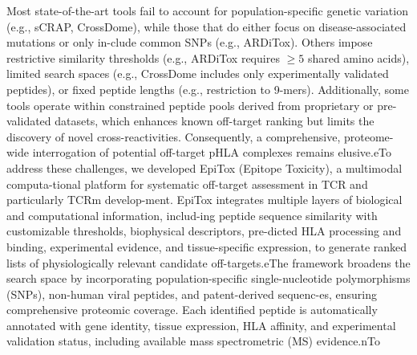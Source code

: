 \documentclass[unnumsec,webpdf,contemporary,large]{oup-authoring-template}%
\theoremstyle{thmstyleone}%
\theoremstyle{thmstyletwo}%
\theoremstyle{thmstylethree}%
\begin{document}
    Most state-of-the-art tools fail to account for population-specific genetic variation (e.g., sCRAP, CrossDome), while those that do either focus on disease-associated mutations or only in-clude common SNPs (e.g., ARDiTox). Others impose restrictive similarity thresholds (e.g., ARDiTox requires $\geq5$ shared amino acids), limited search spaces (e.g., CrossDome includes only experimentally validated peptides), or fixed peptide lengths (e.g., restriction to 9-mers). Additionally, some tools operate within constrained peptide pools derived from proprietary or pre-validated datasets, which enhances known off-target ranking but limits the discovery of novel cross-reactivities. 
    Consequently, a comprehensive, proteome-wide interrogation of potential off-target pHLA complexes remains elusive.eTo address these challenges, we developed EpiTox (Epitope Toxicity), a multimodal computa-tional platform for systematic off-target assessment in TCR and particularly TCRm develop-ment. 
    EpiTox integrates multiple layers of biological and computational information, includ-ing peptide sequence similarity with customizable thresholds, biophysical descriptors, pre-dicted HLA processing and binding, experimental evidence, and tissue-specific expression, to generate ranked lists of physiologically relevant candidate off-targets.eThe framework broadens the search space by incorporating population-specific single-nucleotide polymorphisms (SNPs), non-human viral peptides, and patent-derived sequenc-es, ensuring comprehensive proteomic coverage. Each identified peptide is automatically annotated with gene identity, tissue expression, HLA affinity, and experimental validation status, including available mass spectrometric (MS) evidence.nTo 

    
    
\end{document}
